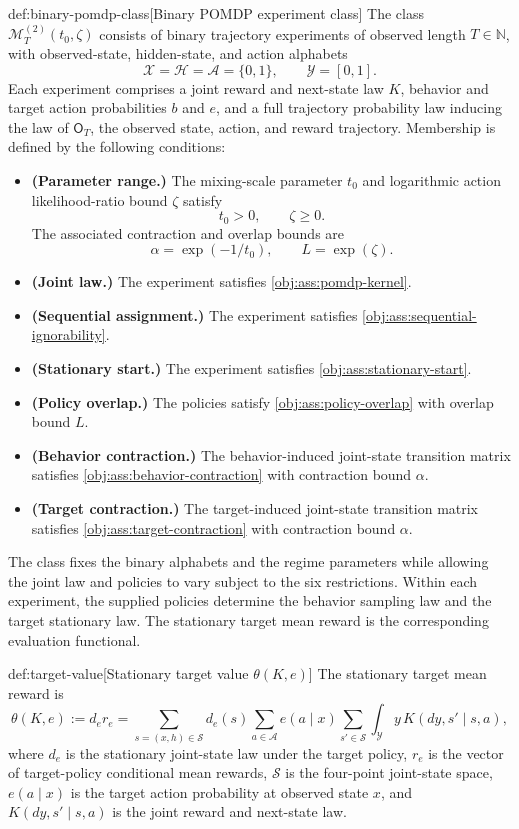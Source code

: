 \begin{definitionv}{def:binary-pomdp-class}[Binary POMDP experiment class]
The class \(\mathcal M_T^{(2)}(t_0,\zeta)\) consists of binary trajectory experiments of observed length \(T\in\mathbb N\), with observed-state, hidden-state, and action alphabets
\[
\mathcal X=\mathcal H=\mathcal A=\{0,1\},
\qquad \mathcal Y=[0,1].
\]
Each experiment comprises a joint reward and next-state law \(K\), behavior and target action probabilities \(b\) and \(e\), and a full trajectory probability law inducing the law of \(\mathsf O_T\), the observed state, action, and reward trajectory. Membership is defined by the following conditions:
\begin{itemize}
\item \textbf{(Parameter range.)} The mixing-scale parameter \(t_0\) and logarithmic action likelihood-ratio bound \(\zeta\) satisfy
\[
t_0>0,\qquad \zeta\ge 0.
\]
The associated contraction and overlap bounds are
\[
\alpha=\exp(-1/t_0),\qquad L=\exp(\zeta).
\]
\item \textbf{(Joint law.)} The experiment satisfies \cref{obj:ass:pomdp-kernel}.
\item \textbf{(Sequential assignment.)} The experiment satisfies \cref{obj:ass:sequential-ignorability}.
\item \textbf{(Stationary start.)} The experiment satisfies \cref{obj:ass:stationary-start}.
\item \textbf{(Policy overlap.)} The policies satisfy \cref{obj:ass:policy-overlap} with overlap bound \(L\).
\item \textbf{(Behavior contraction.)} The behavior-induced joint-state transition matrix satisfies \cref{obj:ass:behavior-contraction} with contraction bound \(\alpha\).
\item \textbf{(Target contraction.)} The target-induced joint-state transition matrix satisfies \cref{obj:ass:target-contraction} with contraction bound \(\alpha\).
\end{itemize}
\end{definitionv}

The class fixes the binary alphabets and the regime parameters while allowing the joint law and policies to vary subject to the six restrictions. Within each experiment, the supplied policies determine the behavior sampling law and the target stationary law. The stationary target mean reward  is the corresponding evaluation functional.

\begin{definitionv}{def:target-value}[Stationary target value $\theta(K,e)$]
The stationary target mean reward is
\[
\theta(K,e)
:=
d_e r_e
=
\sum_{s=(x,h)\in\mathcal S}
d_e(s)
\sum_{a\in\mathcal A}
e(a\mid x)
\sum_{s'\in\mathcal S}
\int_{\mathcal Y}
y\,K(dy,s'\mid s,a),
\]
where \(d_e\) is the stationary joint-state law under the target policy, \(r_e\) is the vector of target-policy conditional mean rewards, \(\mathcal S\) is the four-point joint-state space, \(e(a\mid x)\) is the target action probability at observed state \(x\), and \(K(dy,s'\mid s,a)\) is the joint reward and next-state law.
\end{definitionv}

